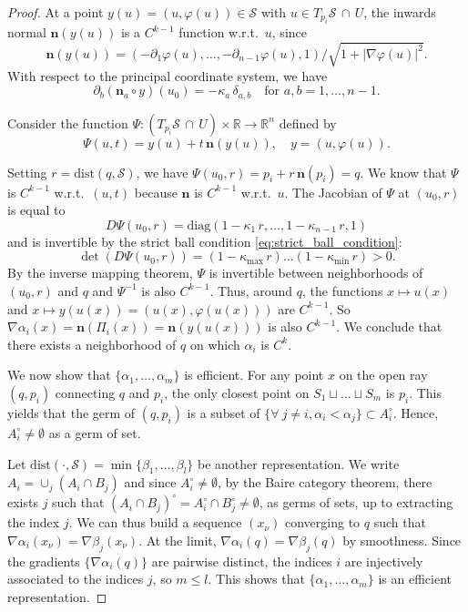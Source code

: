 \documentclass[11pt]{article}
\newcommand{\R}{\mathbb{R}}
\newcommand{\nbf}{\mathbf{n}}
\newcommand{\kap}{\kappa}
\newcommand{\kapmax}{\kappa_{\text{max}}}
\newcommand{\kapmin}{\kappa_{\text{min}}}
\newcommand{\inter}{\cap}
\newcommand{\union}{\cup}
\newcommand{\dist}{\mathrm{dist}}
\newcommand{\Surf}{\mathcal{S}}
\newcommand{\grad}{\nabla}
\theoremstyle{plain}
\theoremstyle{definition}
\theoremstyle{remark}
\begin{document}
\begin{proof}
At a point $y(u) = (u, \varphi(u)) \in \Surf$ with $u \in T_{p_i}\Surf \, \inter \, U$, the inwards normal $\nbf(y(u))$ is a $C^{k-1}$ function w.r.t.~$u$, since
\[ \nbf(y(u)) = \left(-\partial_1 \varphi(u),\ldots, -\partial_{n-1} \varphi(u), 1 \right) /  \sqrt{1 + |\grad \varphi (u)|^2}.\]
With respect to the principal coordinate system, we have
\[\partial_b( \nbf_a \circ y)(u_0) = - \kap_a \, \delta_{a,b} \quad \text{for } a,b = 1,\ldots, n-1.\]

Consider the function $\Psi : (T_{p_i}\Surf \, \inter \, U) \times \R \to \R^n$ defined by
\begin{equation}\label{eq:from_piece_to_distlevel}
\Psi(u, t) = y(u) + t \, \nbf(y(u)), \quad y = (u, \varphi(u)).
\end{equation}

Setting $r = \dist(q,\Surf)$, we have $\Psi(u_0,r) = p_i + r \, \nbf(p_i) = q$.
We know that $\Psi$ is $C^{k-1}$ w.r.t.~$(u,t)$ because $\nbf$ is $C^{k-1}$ w.r.t.~$u$. The Jacobian of $\Psi$ at $(u_0,r)$ is equal to 
\[D\Psi(u_0,r) = \text{diag}\left(1-\kap_1 \, r, \ldots, 1-\kap_{n-1} \, r, 1 \right)\]
and is invertible by the strict ball condition \eqref{eq:strict_ball_condition}:
\[\det(D\Psi(u_0,r)) = (1-\kapmax \, r) \ldots (1-\kapmin \, r) > 0.\]
By the inverse mapping theorem, $\Psi$ is invertible between neighborhoods of $(u_0,r)$ and $q$ and $\Psi^{-1}$ is also $C^{k-1}$. Thus, around $q$, the functions $x \mapsto u(x)$ and $x \mapsto y(u(x)) = (u(x), \varphi(u(x)))$ are $C^{k-1}$. So $\grad \alpha_i(x) = \nbf(\Pi_i(x)) = \nbf(y(u(x)))$ is also $C^{k-1}$. We conclude that there exists a neighborhood of $q$ on which $\alpha_i$ is $C^k$.

We now show that $\{\alpha_1,\ldots,\alpha_m\}$ is efficient. 
For any point $x$ on the open ray $(q,p_i)$ connecting $q$ and $p_i$,
the only closest point on $S_1 \sqcup \ldots \sqcup S_m$ is $p_i$.
This yields that the germ of $(q,p_i)$ 
is a subset of $\{\forall\ j \neq i, \alpha_i < \alpha_j \} \subset A_i^\circ$. Hence, $A_i^\circ \neq \emptyset$ as a germ of set.  

Let $\dist(\cdot, \Surf) = \min \{\beta_1,\ldots,\beta_l\}$ be another representation. We write $A_i = \union_j (A_i \inter B_j)$ and since $A_i^\circ \neq \emptyset$, by the Baire category theorem, there exists $j$ such that $(A_i \inter B_j)^\circ = A_i^\circ \inter B_j^\circ \neq \emptyset$, as germs of sets, up to extracting the index $j$. We can thus build a sequence $(x_\nu)$ converging to $q$ such that $\grad \alpha_i(x_\nu) = \grad \beta_j(x_\nu)$. At the limit, $\grad \alpha_i(q) = \grad \beta_j(q)$ by smoothness. Since the gradients $\{\grad \alpha_i(q) \}$ are pairwise distinct, the indices $i$ are injectively associated to the indices $j$, so $m \leq l$.
This shows that $\{\alpha_1,\ldots,\alpha_m\}$ is an efficient representation.
\end{proof}
\end{document}
